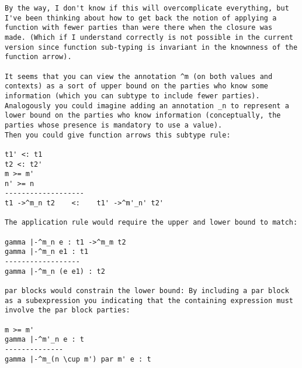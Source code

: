 \documentclass[10pt]{article}
\begin{document}
\begin{verbatim}
By the way, I don't know if this will overcomplicate everything, but
I've been thinking about how to get back the notion of applying a
function with fewer parties than were there when the closure was
made. (Which if I understand correctly is not possible in the current
version since function sub-typing is invariant in the knownness of the
function arrow). 

It seems that you can view the annotation ^m (on both values and
contexts) as a sort of upper bound on the parties who know some
information (which you can subtype to include fewer parties). 
Analogously you could imagine adding an annotation _n to represent a
lower bound on the parties who know information (conceptually, the
parties whose presence is mandatory to use a value). 
Then you could give function arrows this subtype rule:

t1' <: t1
t2 <: t2'
m >= m'
n' >= n
-------------------
t1 ->^m_n t2    <:    t1' ->^m'_n' t2'

The application rule would require the upper and lower bound to match: 

gamma |-^m_n e : t1 ->^m_m t2
gamma |-^m_n e1 : t1
------------------
gamma |-^m_n (e e1) : t2

par blocks would constrain the lower bound: By including a par block
as a subexpression you indicating that the containing expression must
involve the par block parties: 

m >= m'
gamma |-^m'_n e : t
--------------
gamma |-^m_(n \cup m') par m' e : t
\end{verbatim}
\end{document}
